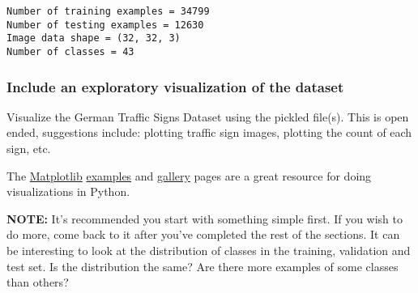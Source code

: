 \documentclass[11pt]{article}
\begin{document}
    \begin{Verbatim}[commandchars=\\\{\}]
Number of training examples = 34799
Number of testing examples = 12630
Image data shape = (32, 32, 3)
Number of classes = 43

    \end{Verbatim}

    \hypertarget{include-an-exploratory-visualization-of-the-dataset}{%
\subsubsection{Include an exploratory visualization of the
dataset}\label{include-an-exploratory-visualization-of-the-dataset}}

    Visualize the German Traffic Signs Dataset using the pickled file(s).
This is open ended, suggestions include: plotting traffic sign images,
plotting the count of each sign, etc.

The \href{http://matplotlib.org/}{Matplotlib}
\href{http://matplotlib.org/examples/index.html}{examples} and
\href{http://matplotlib.org/gallery.html}{gallery} pages are a great
resource for doing visualizations in Python.

\textbf{NOTE:} It's recommended you start with something simple first.
If you wish to do more, come back to it after you've completed the rest
of the sections. It can be interesting to look at the distribution of
classes in the training, validation and test set. Is the distribution
the same? Are there more examples of some classes than others?
\end{document}
